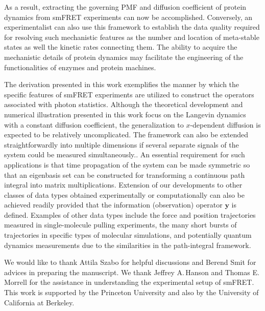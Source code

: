 \documentclass[journal=jpcbfk,manuscript=article,layout=twocolumn,articletitle=true]{achemso}
\begin{document}
As a result, extracting the governing PMF and diffusion coefficient of protein dynamics from smFRET experiments can now be accomplished. Conversely, an experimentalist can also use this framework to establish the data quality required for resolving such mechanistic features as the number and location of meta-stable states as well the kinetic rates connecting them. The ability to acquire the mechanistic details of protein dynamics may facilitate the engineering of the functionalities of enzymes and protein machines.\cite{Wang:2008wl}

The derivation presented in this work exemplifies the manner by which the specific features of smFRET experiments are utilized to construct the operators associated with photon statistics. Although the theoretical development and numerical illustration presented in this work focus on the Langevin dynamics with a constant diffusion coefficient, the generalization to $x$-dependent diffusion is expected to be relatively uncomplicated. The framework can also be extended straightforwardly into multiple dimensions if several separate signals of the system could be measured simultaneously.\cite{Uphoff:2010fd,Chodera:2011cc}. An essential requirement for such applications is that time propagation of the system can be made symmetric so that an eigenbasis set can be constructed for transforming a continuous path integral into matrix multiplications. Extension of our developments to other classes of data types obtained experimentally or computationally can also be achieved readily provided that the information (observation) operator $\bm{y}$ is defined. Examples of other data types include the force and position trajectories measured in single-molecule pulling experiments,\cite{Mossa:2009fz} the many short bursts of trajectories in specific types of molecular simulations,\cite{Anonymous:NH8yUbI6,Wells:1983ts} and potentially quantum dynamics measurements due to the similarities in the path-integral framework.\cite{Feynman:2012wb} 

\begin{acknowledgement}

We would like to thank Attila Szabo for helpful discussions and Berend Smit for advices in preparing the manuscript.  We thank Jeffrey A.\,Hanson and Thomas E.\,Morrell for the assistance in understanding the experimental setup of smFRET. This work is supported by the Princeton University and also by the University of California at Berkeley.
\end{acknowledgement}
\end{document}
